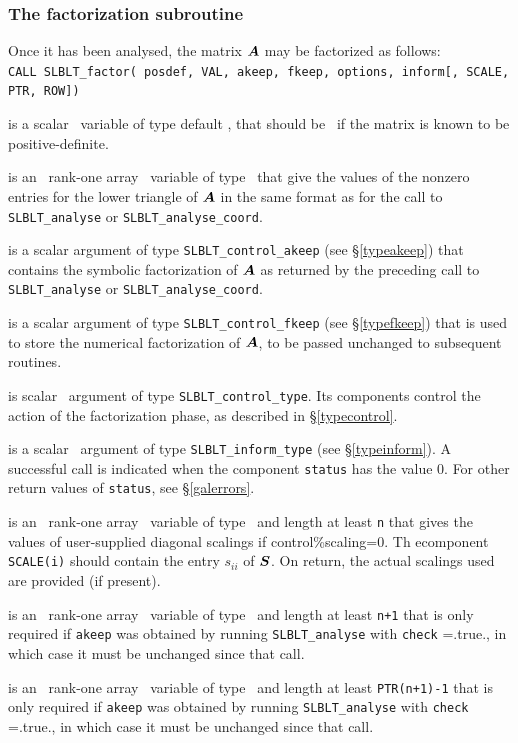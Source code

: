\documentclass{galahad}
\newcommand{\packagename}{SLBLT}
\begin{document}

\subsubsection{The factorization subroutine}

Once it has been analysed, the matrix ${\bm{A}}$ may be factorized as follows: \\

\hskip0.5in
{\tt CALL \packagename\_factor( posdef, VAL, akeep, fkeep, options, inform{[}, SCALE, PTR, ROW{]})}

\begin{description}
is a scalar \intentin\ variable of type default \logical, 
that should be \true\ if the matrix is known to be positive-definite.

 is an \optional\ rank-one array \intentin\ variable of type \realdp\
that give the values of the nonzero entries for the lower triangle of ${\bm{A}}$ 
in the same format as for the call to {\tt \packagename\_analyse} or 
{\tt \packagename\_analyse\_coord}.

 is a scalar \intentin argument of type
{\tt \packagename\_control\_akeep}
(see \S\ref{typeakeep}) that contains the symbolic factorization of ${\bm{A}}$
as returned by the preceding call
to {\tt \packagename\_analyse} or {\tt \packagename\_analyse\_coord}.

 is a scalar \intentinout argument of type
{\tt \packagename\_control\_fkeep}
(see \S\ref{typefkeep}) that is used to store the 
numerical factorization of ${\bm{A}}$, to be passed
unchanged to subsequent routines.

 is scalar \intentin\ argument of type
{\tt \packagename\_control\_type}. Its components control the action
of the factorization phase, as described in \S\ref{typecontrol}.

 is a scalar \intentinout\ argument of type
{\tt \packagename\_inform\_type} (see \S\ref{typeinform}).
A successful call is indicated when the  component {\tt status} has the value 0.
For other return values of {\tt status}, see \S\ref{galerrors}.

 is an \optional\ rank-one array \intentinout\ variable of type 
\realdp\ and length at least {\tt n} that gives the values of 
user-supplied diagonal scalings if control\%scaling=0. Th ecomponent
{\tt SCALE(i)} should contain the entry $s_{ii}$ of ${\bm{S}}$. 
On return, the actual scalings used are provided (if present).

 is an \optional\ rank-one array \intentin\ variable of type 
\longinteger\ and length at least {\tt n+1} that is only required if 
{\tt akeep} was obtained by running {\tt \packagename\_analyse} with
{\tt check} =.true., in which case it must be unchanged since that call.

 is an \optional\ rank-one array \intentin\ variable of type 
\integer\ and length at least {\tt PTR(n+1)-1} that is only required if 
{\tt akeep} was obtained by running {\tt \packagename\_analyse} with
{\tt check} =.true., in which case it must be unchanged since that call.

\end{description}
\end{document}
